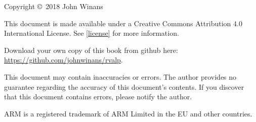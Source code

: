 \thispagestyle{plain}

Copyright \copyright\ 2018 John Winans 

This document is made available under a Creative Commons Attribution 4.0 
International License.  See \autoref{license} for more information.

Download your own copy of this book from github here: 
\url{https://github.com/johnwinans/rvalp}.

This document may contain inaccuracies or errors.  The author provides no 
guarantee regarding the accuracy of this document's contents.  If you 
discover that this document contains errors, please notify the author.



ARM\rtm{} is a registered trademark of ARM Limited in the 
EU and other countries.
